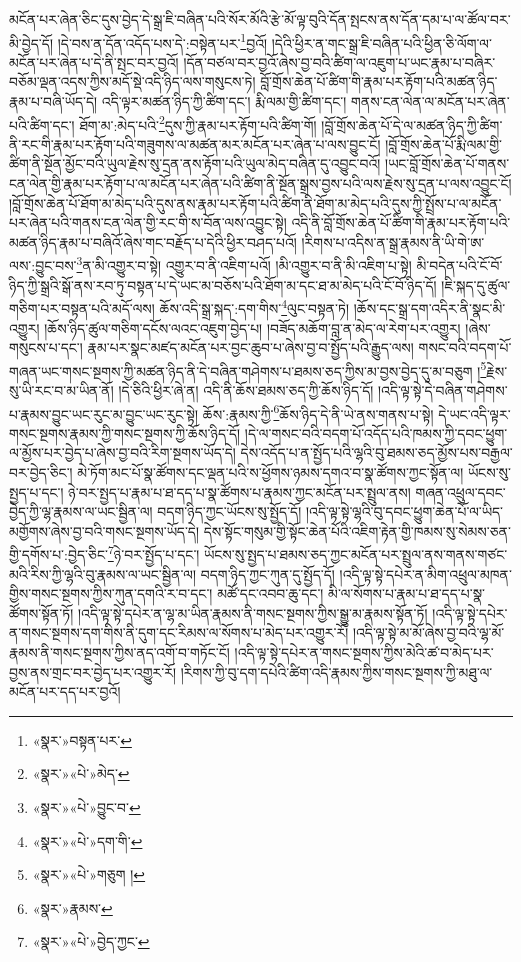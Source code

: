 མངོན་པར་ཞེན་ཅིང་དུས་བྱེད་དེ་སྒྲ་ཇི་བཞིན་པའི་སོར་མོའི་རྩེ་མོ་ལྟ་བུའི་དོན་སྤངས་ནས་དོན་དམ་པ་ལ་ཚོལ་བར་མི་བྱེད་དོ། །དེ་བས་ན་དོན་འདོད་པས་དེ་:བསྟེན་པར་\footnote{«སྣར་»བསྟན་པར་}བྱའོ། །དེའི་ཕྱིར་ན་གང་སྒྲ་ཇི་བཞིན་པའི་ཕྱིན་ཅི་ལོག་ལ་མངོན་པར་ཞེན་པ་དེ་ནི་སྤང་བར་བྱའོ། །དོན་བཙལ་བར་བྱའོ་ཞེས་བྱ་བའི་ཚིག་ལ་འཇུག་པ་ཡང་རྣམ་པ་བཞིར་བཅོམ་ལྡན་འདས་ཀྱིས་མདོ་སྡེ་འདི་ཉིད་ལས་གསུངས་ཏེ། བློ་གྲོས་ཆེན་པོ་ཚིག་གི་རྣམ་པར་རྟོག་པའི་མཚན་ཉིད་རྣམ་པ་བཞི་ཡོད་དེ། འདི་ལྟར་མཚན་ཉིད་ཀྱི་ཚིག་དང་། རྨི་ལམ་གྱི་ཚིག་དང་། གནས་ངན་ལེན་ལ་མངོན་པར་ཞེན་པའི་ཚིག་དང་། ཐོག་མ་:མེད་པའི་\footnote{«སྣར་»«པེ་»མེད་}དུས་ཀྱི་རྣམ་པར་རྟོག་པའི་ཚིག་གོ། །བློ་གྲོས་ཆེན་པོ་དེ་ལ་མཚན་ཉིད་ཀྱི་ཚིག་ནི་རང་གི་རྣམ་པར་རྟོག་པའི་གཟུགས་ལ་མཚན་མར་མངོན་པར་ཞེན་པ་ལས་བྱུང་ངོ། །བློ་གྲོས་ཆེན་པོ་རྨི་ལམ་གྱི་ཚིག་ནི་སྔོན་མྱོང་བའི་ཡུལ་རྗེས་སུ་དྲན་ནས་རྟོག་པའི་ཡུལ་མེད་བཞིན་དུ་འབྱུང་བའོ། །ཡང་བློ་གྲོས་ཆེན་པོ་གནས་ངན་ལེན་གྱི་རྣམ་པར་རྟོག་པ་ལ་མངོན་པར་ཞེན་པའི་ཚིག་ནི་སྔོན་སྒྲས་བྱས་པའི་ལས་རྗེས་སུ་དྲན་པ་ལས་འབྱུང་ངོ། །བློ་གྲོས་ཆེན་པོ་ཐོག་མ་མེད་པའི་དུས་ནས་རྣམ་པར་རྟོག་པའི་ཚིག་ནི་ཐོག་མ་མེད་པའི་དུས་ཀྱི་སྤྲོས་པ་ལ་མངོན་པར་ཞེན་པའི་གནས་ངན་ལེན་གྱི་རང་གི་ས་བོན་ལས་འབྱུང་སྟེ། འདི་ནི་བློ་གྲོས་ཆེན་པོ་ཚིག་གི་རྣམ་པར་རྟོག་པའི་མཚན་ཉིད་རྣམ་པ་བཞིའོ་ཞེས་གང་བརྗོད་པ་དེའི་ཕྱིར་བཤད་པའོ། །རིགས་པ་འདིས་ན་སྒྲ་རྣམས་ནི་ཡི་གེ་ཨ་ལས་:བྱུང་བས་\footnote{«སྣར་»«པེ་»བྱུང་བ་}ན་མི་འགྱུར་བ་སྟེ། འགྱུར་བ་ནི་འཇིག་པའོ། །མི་འགྱུར་བ་ནི་མི་འཇིག་པ་སྟེ། མི་བདེན་པའི་ངོ་བོ་ཉིད་ཀྱི་སྒྲའི་སྒོ་ནས་རབ་ཏུ་བསྟན་པ་དེ་ཡང་མ་བཅོས་པའི་ཐོག་མ་དང་ཐ་མ་མེད་པའི་ངོ་བོ་ཉིད་དོ། །ཇི་སྐད་དུ་ཚུལ་གཅིག་པར་བསྟན་པའི་མདོ་ལས། ཆོས་འདི་སྒྲ་སྐད་:དག་གིས་\footnote{«སྣར་»«པེ་»དག་གི་}ལུང་བསྟན་ཏེ། །ཆོས་དང་སྒྲ་དག་འདིར་ནི་སྣང་མི་འགྱུར། །ཆོས་ཉིད་ཚུལ་གཅིག་དངོས་ལའང་འཇུག་བྱེད་པ། །བཟོད་མཆོག་བླ་ན་མེད་ལ་རེག་པར་འགྱུར། །ཞེས་གསུངས་པ་དང་། རྣམ་པར་སྣང་མཛད་མངོན་པར་བྱང་ཆུབ་པ་ཞེས་བྱ་བ་སྤྱོད་པའི་རྒྱུད་ལས། གསང་བའི་བདག་པོ་གཞན་ཡང་གསང་སྔགས་ཀྱི་མཚན་ཉིད་ནི་དེ་བཞིན་གཤེགས་པ་ཐམས་ཅད་ཀྱིས་མ་བྱས་བྱེད་དུ་མ་བཅུག །\footnote{«སྣར་»«པེ་»གཅུག །}རྗེས་སུ་ཡི་རང་བ་མ་ཡིན་ནོ། །དེ་ཅིའི་ཕྱིར་ཞེ་ན། འདི་ནི་ཆོས་ཐམས་ཅད་ཀྱི་ཆོས་ཉིད་དོ། །འདི་ལྟ་སྟེ་དེ་བཞིན་གཤེགས་པ་རྣམས་བྱུང་ཡང་རུང་མ་བྱུང་ཡང་རུང་སྟེ། ཆོས་:རྣམས་ཀྱི་\footnote{«སྣར་»རྣམས་}ཆོས་ཉིད་དེ་ནི་ཡེ་ནས་གནས་པ་སྟེ། དེ་ཡང་འདི་ལྟར་གསང་སྔགས་རྣམས་ཀྱི་གསང་སྔགས་ཀྱི་ཆོས་ཉིད་དོ། །དེ་ལ་གསང་བའི་བདག་པོ་འདོད་པའི་ཁམས་ཀྱི་དབང་ཕྱུག་ལ་མྱོས་པར་བྱེད་པ་ཞེས་བྱ་བའི་རིག་སྔགས་ཡོད་དེ། དེས་འདོད་པ་ན་སྤྱོད་པའི་ལྷའི་བུ་ཐམས་ཅད་མྱོས་པས་བརྒྱལ་བར་བྱེད་ཅིང་། མེ་ཏོག་མང་པོ་སྣ་ཚོགས་དང་ལྡན་པའི་ས་ཕྱོགས་ཉམས་དགའ་བ་སྣ་ཚོགས་ཀྱང་སྟོན་ལ། ཡོངས་སུ་སྤྱད་པ་དང་། ཉེ་བར་སྤྱད་པ་རྣམ་པ་ཐ་དད་པ་སྣ་ཚོགས་པ་རྣམས་ཀྱང་མངོན་པར་སྤྲུལ་ནས། གཞན་འཕྲུལ་དབང་བྱེད་ཀྱི་ལྷ་རྣམས་ལ་ཡང་སྦྱིན་ལ། བདག་ཉིད་ཀྱང་ཡོངས་སུ་སྤྱོད་དོ། །འདི་ལྟ་སྟེ་ལྷའི་བུ་དབང་ཕྱུག་ཆེན་པོ་ལ་ཡིད་མགྱོགས་ཞེས་བྱ་བའི་གསང་སྔགས་ཡོད་དེ། དེས་སྟོང་གསུམ་གྱི་སྟོང་ཆེན་པོའི་འཇིག་རྟེན་གྱི་ཁམས་སུ་སེམས་ཅན་གྱི་དགོས་པ་:བྱེད་ཅིང་\footnote{«སྣར་»«པེ་»བྱེད་ཀྱང་}ཉེ་བར་སྤྱོད་པ་དང་། ཡོངས་སུ་སྤྱད་པ་ཐམས་ཅད་ཀྱང་མངོན་པར་སྤྲུལ་ནས་གནས་གཙང་མའི་རིས་ཀྱི་ལྷའི་བུ་རྣམས་ལ་ཡང་སྦྱིན་ལ། བདག་ཉིད་ཀྱང་ཀུན་དུ་སྤྱོད་དོ། །འདི་ལྟ་སྟེ་དཔེར་ན་མིག་འཕྲུལ་མཁན་གྱིས་གསང་སྔགས་ཀྱིས་ཀུན་དགའི་ར་བ་དང་། མཚོ་དང་འབབ་ཆུ་དང་། མི་ལ་སོགས་པ་རྣམ་པ་ཐ་དད་པ་སྣ་ཚོགས་སྟོན་ཏོ། །འདི་ལྟ་སྟེ་དཔེར་ན་ལྷ་མ་ཡིན་རྣམས་ནི་གསང་སྔགས་ཀྱིས་སྒྱུ་མ་རྣམས་སྟོན་ཏོ། །འདི་ལྟ་སྟེ་དཔེར་ན་གསང་སྔགས་དག་གིས་ནི་དུག་དང་རིམས་ལ་སོགས་པ་མེད་པར་འགྱུར་རོ། །འདི་ལྟ་སྟེ་མ་མོ་ཞེས་བྱ་བའི་ལྷ་མོ་རྣམས་ནི་གསང་སྔགས་ཀྱིས་ནད་འགོ་བ་གཏོང་ངོ། །འདི་ལྟ་སྟེ་དཔེར་ན་གསང་སྔགས་ཀྱིས་མེའི་ཚ་བ་མེད་པར་བྱས་ནས་གྲང་བར་བྱེད་པར་འགྱུར་རོ། །རིགས་ཀྱི་བུ་དག་དཔེའི་ཚིག་འདི་རྣམས་ཀྱིས་གསང་སྔགས་ཀྱི་མཐུ་ལ་མངོན་པར་དད་པར་བྱའོ། 